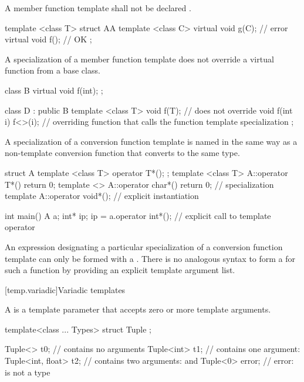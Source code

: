 \pnum
A member function template shall not be declared .
\begin{example}
\begin{codeblock}
template <class T> struct AA {
  template <class C> virtual void g(C);             // error
  virtual void f();                                 // OK
};
\end{codeblock}
\end{example}

\pnum
A specialization of
a member function template does not override a virtual function from a
base class.
\begin{example}
\begin{codeblock}
class B {
  virtual void f(int);
};

class D : public B {
  template <class T> void f(T); // does not override 
  void f(int i) { f<>(i); }     // overriding function that calls the function template specialization
};
\end{codeblock}
\end{example}

\pnum
\begin{note}
A specialization of a
conversion function template
is named in
the same way as a non-template conversion function that converts to
the same type.
\begin{example}
\begin{codeblock}
struct A {
  template <class T> operator T*();
};
template <class T> A::operator T*() { return 0; }
template <> A::operator char*() { return 0; }       // specialization
template A::operator void*();                       // explicit instantiation

int main() {
  A a;
  int* ip;
  ip = a.operator int*();       // explicit call to template operator 
}
\end{codeblock}
\end{example}
An expression designating
a particular specialization of a conversion function template
can only be formed with a .
There is no analogous syntax to form a 
for such a function
by providing an explicit template argument list.
\end{note}

[temp.variadic]{Variadic templates}

\pnum
A  is a template parameter
that accepts zero or more template arguments.
\begin{example}
\begin{codeblock}
template<class ... Types> struct Tuple { };

Tuple<> t0;                     //  contains no arguments
Tuple<int> t1;                  //  contains one argument: 
Tuple<int, float> t2;           //  contains two arguments:  and 
Tuple<0> error;                 // error:  is not a type
\end{codeblock}
\end{example}


